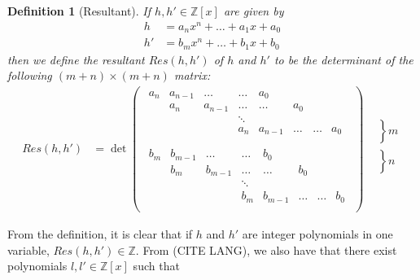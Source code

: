 \documentclass[11pt]{report}
\newtheorem{definition}{Definition}
\newcommand{\Z}{\mathbb{Z}}
\newcommand{\Zx}{\mathbb{Z}[x]}
\begin{document}
\begin{definition}[Resultant]
If $h,h'\in \Zx$ are given by
\begin{align*}
h &= a_nx^n+\ldots+a_1x+a_0\\
h' &= b_mx^n+\ldots+b_1x+b_0
\end{align*}
then we define the \emph{resultant} $Res(h,h')$ of $h$ and $h'$ to be the determinant of the following $(m+n)\times (m+n)$ matrix:
\begin{align*}
Res(h,h') &= \det\left(\begin{array}{c}\begin{array}{cccccccccc|}
			a_n & a_{n-1} & \ldots & \ldots & a_0 \\
			\ & a_n & a_{n-1} & \ldots & \ldots & a_0 \\
			\ & \ & \ & \ddots \\
			\ & \ & \ & a_n & a_{n-1} & \ldots & \ldots & a_0 \\
			\end{array}\\
			\begin{array}{cccccccc}
			b_m & b_{m-1} & \ldots & \ldots & b_0 \\
			\ & b_m & b_{m-1} & \ldots & \ldots & b_0 \\
			\ & \ & \ & \ddots \\
			\ & \ & \ & b_m & b_{m-1} & \ldots & \ldots & b_0 \\
		   \end{array}\end{array}\right)
		   \begin{array}{c}
		   \left.\begin{array}{cccc}
	            \\ \\ \\ \\
		   \end{array}\right\}m \\
		   \left.\begin{array}{cccc}
		   \\ \\ \\ \\
		   \end{array}\right\}n \\
		   \end{array}
\end{align*}
\end{definition}
From the definition, it is clear that if $h$ and $h'$ are integer polynomials in one variable, $Res(h,h') \in \Z$. From (CITE LANG), we also have that there exist polynomials $l,l'\in \Zx$ such that
\end{document}
